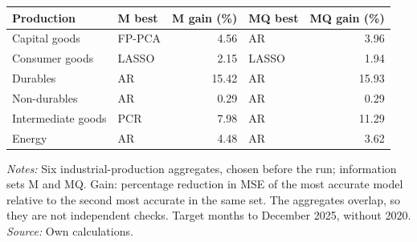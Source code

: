 \begin{threeparttable}
\begin{tabular}{llrlr}
\toprule
Production & M best & M gain (\%) & MQ best & MQ gain (\%) \\
\midrule
Capital goods & FP-PCA & 4.56 & AR & 3.96 \\
Consumer goods & LASSO & 2.15 & LASSO & 1.94 \\
Durables & AR & 15.42 & AR & 15.93 \\
Non-durables & AR & 0.29 & AR & 0.29 \\
Intermediate goods & PCR & 7.98 & AR & 11.29 \\
Energy & AR & 4.48 & AR & 3.62 \\
\bottomrule
\end{tabular}
\begin{tablenotes}[flushleft]\footnotesize
\item \textit{Notes:} Six industrial-production aggregates, chosen before the run; information sets M and MQ. Gain: percentage reduction in MSE of the most accurate model relative to the second most accurate in the same set. The aggregates overlap, so they are not independent checks. Target months to December 2025, without 2020. \textit{Source:} Own calculations.
\end{tablenotes}
\end{threeparttable}
